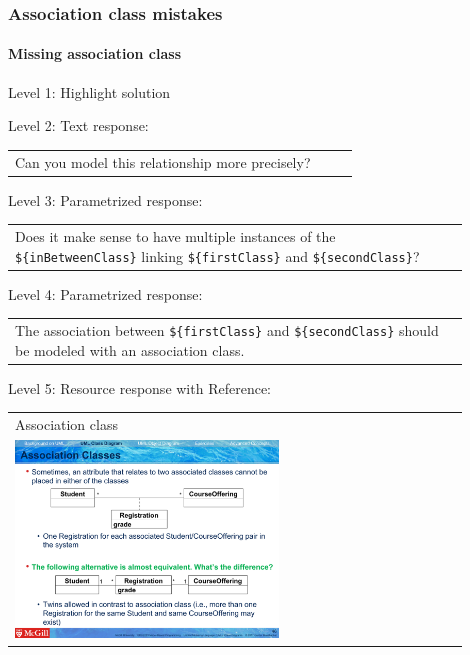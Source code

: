 \subsubsection{Association class mistakes}

\paragraph{Missing association class}

\noindent Level 1: Highlight solution \medskip

\noindent Level 2: Text response: \medskip

\begin{tabular}{|p{0.9\linewidth}}
Can you model this relationship more precisely?
\end{tabular} \medskip

\noindent Level 3: Parametrized response: \medskip

\begin{tabular}{|p{0.9\linewidth}}
Does it make sense to have multiple instances of the \verb|${inBetweenClass}| linking \verb|${firstClass}| and \verb|${secondClass}|?
\end{tabular} \medskip

\noindent Level 4: Parametrized response: \medskip

\begin{tabular}{|p{0.9\linewidth}}
The association between \verb|${firstClass}| and \verb|${secondClass}| should be modeled with an association class.
\end{tabular} \medskip

\noindent Level 5: Resource response with Reference: \medskip

\begin{tabular}{|p{0.9\linewidth}}
Association class

\\
\includegraphics[width=0.6\textwidth]{images/association_class.png}
\end{tabular} \medskip



